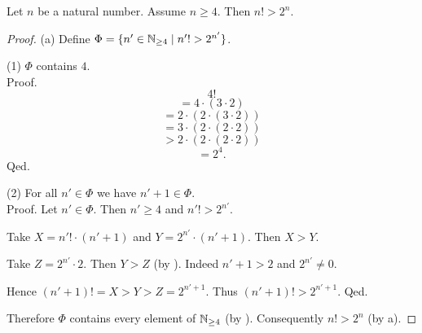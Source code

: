 \documentclass[10pt]{article}
\begin{document}
  \begin{forthel}
    \begin{proposition}[id=ARITHMETIC_12_5413271156817920,printid]
      Let $n$ be a natural number.
      Assume $n \geq 4$.
      Then $n! > 2^{n}$.
    \end{proposition}
    \begin{proof}
      (a) Define $\Phi = \{ n' \in \mathbb{N}_{\geq 4} \mid n'! > 2^{n'} \}$.
  
      (1) $\Phi$ contains $4$. \\
      Proof.
        \[  4!                                  \]
        \[    = 4 \cdot (3 \cdot 2)             \]
        \[    = 2 \cdot (2 \cdot (3 \cdot 2))   \]
        \[    = 3 \cdot (2 \cdot (2 \cdot 2))   \]
        \[    > 2 \cdot (2 \cdot (2 \cdot 2))   \]
        \[    = 2^{4}.                          \]
      Qed.
  
      (2) For all $n' \in \Phi$ we have $n' + 1 \in \Phi$. \\
      Proof.
        Let $n' \in \Phi$.
        Then $n' \geq 4$ and $n'! > 2^{n'}$.

        Take $X = n'! \cdot (n' + 1)$ and $Y = 2^{n'} \cdot (n' + 1)$.
        Then $X > Y$.

        Take $Z = 2^{n'} \cdot 2$.
        Then $Y > Z$ (by ).
        Indeed $n' + 1 > 2$ and $2^{n'} \neq 0$.

        Hence $(n' + 1)! = X > Y > Z = 2^{n' + 1}$.
        Thus $(n' + 1)! > 2^{n' + 1}$.
      Qed.
  
      Therefore $\Phi$ contains every element of $\mathbb{N}_{\geq 4}$ (by ).
      Consequently $n! > 2^{n}$ (by a).
    \end{proof}
  \end{forthel}
\end{document}
